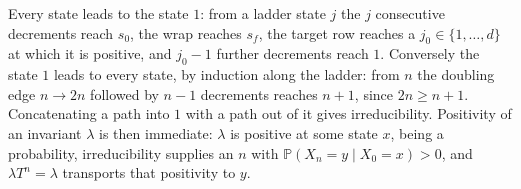 Every state leads to the state $1$: from a ladder state $j$ the $j$ consecutive decrements
reach $s_0$, the wrap reaches $s_f$, the target row reaches a $j_0\in\{1,\dots,d\}$ at which
it is positive, and $j_0-1$ further decrements reach $1$. Conversely the state $1$ leads to
every state, by induction along the ladder: from $n$ the doubling edge $n\rightarrow 2n$
followed by $n-1$ decrements reaches $n+1$, since $2n\geq n+1$. Concatenating a path into
$1$ with a path out of it gives irreducibility. Positivity of an invariant $\lambda$ is then
immediate: $\lambda$ is positive at some state $x$, being a probability, irreducibility
supplies an $n$ with $\mathbb P(X_n=y\mid X_0=x)>0$, and $\lambda T^n=\lambda$ transports
that positivity to $y$.
